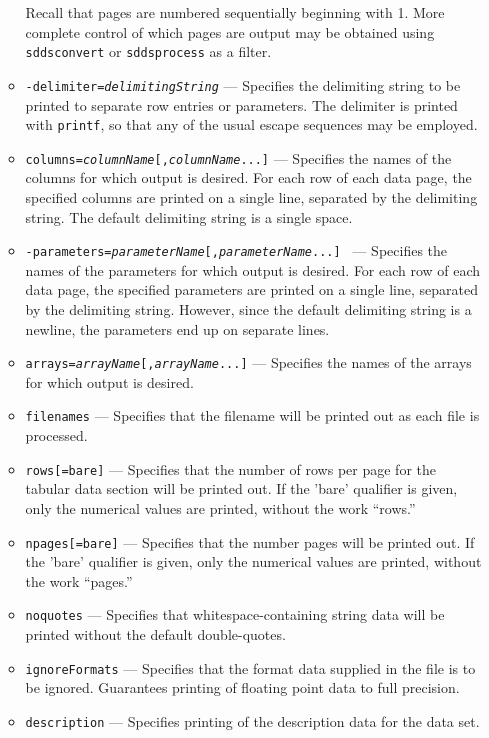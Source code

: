 \begin{itemize}
\begin{itemize}
        Recall that pages are numbered sequentially beginning with 1.  More complete control of which pages 
        are output may be obtained using {\tt sddsconvert} or {\tt sddsprocess} as a filter. 
    \item {\tt -delimiter={\em delimitingString}} --- Specifies the delimiting string to be printed to  
        separate row entries or parameters. The 
        delimiter is printed with \verb|printf|, so that any of the usual escape sequences may be employed. 
    \item {\tt columns={\em columnName}[,{\em columnName}...]} ---  
        Specifies the names of the columns for which output is desired.  For each row of each 
        data page, the specified columns are printed on a single line, separated by the delimiting string.  The 
        default delimiting string is a single space. 
    \item {\tt -parameters={\em parameterName}[,{\em parameterName}...] } 
        --- Specifies the names of the parameters for which output is desired.  For each row of each 
        data page, the specified parameters are printed on a single line, separated by the delimiting string.  However, 
        since the default delimiting string is a newline, the parameters end up on separate lines. 
    \item {\tt arrays={\em arrayName}[,{\em arrayName}...]} ---  
        Specifies the names of the arrays for which output is desired.  
    \item {\tt filenames} --- Specifies that the filename will be printed out as each file is processed. 
    \item \verb|rows[=bare]| --- Specifies that the number of rows per page for the tabular data section will 
        be printed out. If the 'bare' qualifier is given, only the numerical values are printed, without the work ``rows.''
    \item \verb|npages[=bare]| --- Specifies that the number pages will 
        be printed out. If the 'bare' qualifier is given, only the numerical values are printed, without the work ``pages.''
    \item \verb|noquotes| --- Specifies that whitespace-containing string data will be printed without 
        the default double-quotes.  
    \item \verb|ignoreFormats| --- Specifies that the format data supplied in the file is to be
        ignored.  Guarantees printing of floating point data to full precision.
    \item \verb|description| --- Specifies printing of the description data for the data set.

\end{itemize}
\end{itemize}
